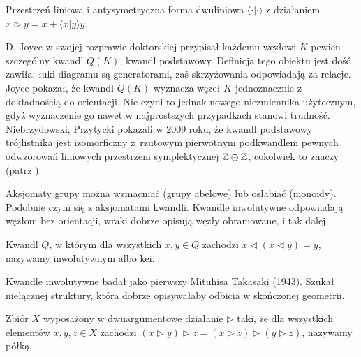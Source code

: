 \begin{example}
%
    Przestrzeń liniowa i antysymetryczna forma dwuliniowa $\langle \cdot | \cdot \rangle$ z działaniem $x \triangleright y = x + \langle x | y \rangle y$.
\end{example}

D. Joyce w swojej rozprawie doktorskiej przypisał każdemu węzłowi $K$ pewien szczególny kwandl $Q(K)$, kwandl podstawowy.
%
Definicja tego obiektu jest dość zawiła: łuki diagramu są generatorami, zaś skrzyżowania odpowiadają za relacje.
Joyce pokazał, że kwandl $Q(K)$ wyznacza węzeł $K$ jednoznacznie z dokładnością do orientacji.
Nie czyni to jednak nowego niezmiennika użytecznym, gdyż wyznaczenie go nawet w najprostszych przypadkach stanowi trudność.
Niebrzydowski, Przytycki pokazali w 2009 roku, że kwandl podstawowy trójlistnika jest izomorficzny z~rzutowym pierwotnym podkwandlem pewnych odwzorowań liniowych przestrzeni symplektycznej $\mathbb Z \oplus \mathbb Z$, cokolwiek to znaczy (patrz \cite{niebrzydowski09}).

Aksjomaty grupy można wzmacniać (grupy abelowe) lub osłabiać (monoidy).
Podobnie czyni się z aksjomatami kwandli.
Kwandle inwolutywne odpowiadają węzłom bez orientacji, wraki dobrze opisują węzły obramowane, i tak dalej.

\begin{definition}
%
%
    Kwandl $Q$, w którym dla wszystkich $x, y \in Q$ zachodzi $x \triangleleft (x \triangleleft y) = y$, nazywamy inwolutywnym albo kei.
\end{definition}

Kwandle inwolutywne badał jako pierwszy Mituhisa Takasaki (1943).
Szukał niełącznej struktury, która dobrze opisywałaby odbicia w skończonej geometrii.

\begin{definition}[półka]
%
    Zbiór $X$ wyposażony w dwuargumentowe działanie $\triangleright$ taki, że dla wszystkich elementów $x, y, z \in X$ zachodzi $(x \triangleright y) \triangleright z = (x \triangleright z) \triangleright (y \triangleright z)$, nazywamy półką.
\end{definition}

